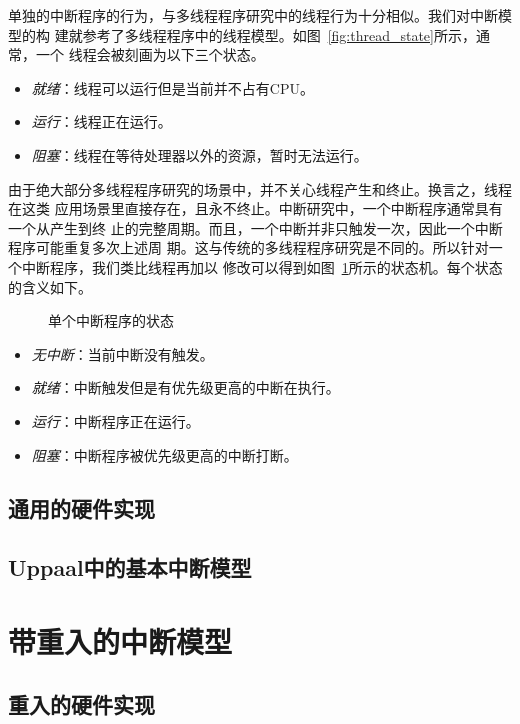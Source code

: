 单独的中断程序的行为，与多线程程序研究中的线程行为十分相似。我们对中断模型的构
建就参考了多线程程序中的线程模型。如图~\ref{fig:thread_state}所示，通常，一个
线程会被刻画为以下三个状态。
\begin{itemize}
	\item \emph{就绪}：线程可以运行但是当前并不占有CPU。
	\item \emph{运行}：线程正在运行。
	\item \emph{阻塞}：线程在等待处理器以外的资源，暂时无法运行。
\end{itemize}
由于绝大部分多线程程序研究的场景中，并不关心线程产生和终止。换言之，线程在这类
应用场景里直接存在，且永不终止。中断研究中，一个中断程序通常具有一个从产生到终
止的完整周期。而且，一个中断并非只触发一次，因此一个中断程序可能重复多次上述周
期。这与传统的多线程程序研究是不同的。所以针对一个中断程序，我们类比线程再加以
修改可以得到如图~\ref{fig:interrupt_state}所示的状态机。每个状态的含义如下。

\begin{figure}[H]
	\centering
	
	\caption{单个中断程序的状态}
	\label{fig:interrupt_state}
\end{figure}

\begin{itemize}
	\item \emph{无中断}：当前中断没有触发。
	\item \emph{就绪}：中断触发但是有优先级更高的中断在执行。
	\item \emph{运行}：中断程序正在运行。
	\item \emph{阻塞}：中断程序被优先级更高的中断打断。
\end{itemize}

\subsection{通用的硬件实现}
\label{subsec:basic_hardware}

\subsection{Uppaal中的基本中断模型}
\label{subsec:basic_uppaal}

\section{带重入的中断模型}
\label{sec:reentrant}

\subsection{重入的硬件实现}
\label{subsec:reentrant_hardware}

